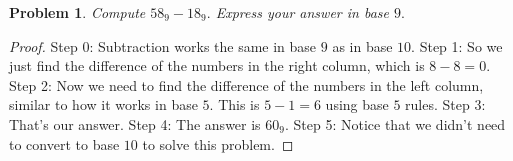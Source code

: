 \documentclass{article}
\newtheorem{theorem}{Problem}
\begin{document}
\begin{theorem}
Compute $58_9 - 18_9.$ Express your answer in base $9.$
\end{theorem}

\begin{proof}
Step 0: Subtraction works the same in base $9$ as in base $10$.
Step 1: So we just find the difference of the numbers in the right column, which is $8-8=0$.
Step 2: Now we need to find the difference of the numbers in the left column, similar to how it works in base $5$. This is $5-1=6$ using base $5$ rules.
Step 3: That's our answer.
Step 4: The answer is $60_9$.
Step 5: Notice that we didn't need to convert to base $10$ to solve this problem.
\end{proof}
\end{document}
